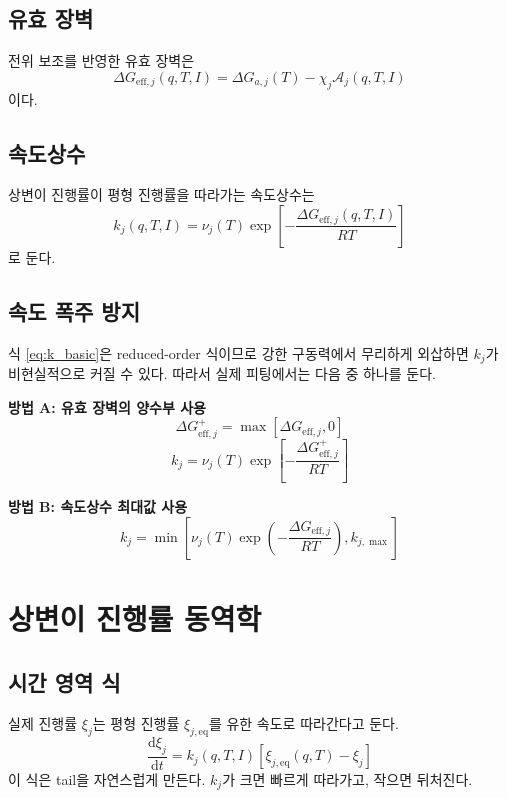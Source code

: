 \documentclass[11pt,a4paper]{article}
\newcommand{\dd}{\mathrm{d}}
\newcommand{\eff}{\mathrm{eff}}
\newcommand{\eq}{\mathrm{eq}}
\begin{document}
\subsection{유효 장벽}
전위 보조를 반영한 유효 장벽은
\begin{equation}
\Delta G_{\eff,j}(q,T,I)=\Delta G_{a,j}(T)-\chi_j\mathcal A_j(q,T,I)
\label{eq:Geff}
\end{equation}
이다.

\subsection{속도상수}
상변이 진행률이 평형 진행률을 따라가는 속도상수는
\begin{equation}
k_j(q,T,I)=\nu_j(T)\exp\left[-\frac{\Delta G_{\eff,j}(q,T,I)}{RT}\right]
\label{eq:k_basic}
\end{equation}
로 둔다.

\subsection{속도 폭주 방지}
식 \eqref{eq:k_basic}은 reduced-order 식이므로 강한 구동력에서 무리하게 외삽하면 \(k_j\)가 비현실적으로 커질 수 있다. 따라서 실제 피팅에서는 다음 중 하나를 둔다.

\textbf{방법 A: 유효 장벽의 양수부 사용}
\begin{equation}
\Delta G_{\eff,j}^{+}=\max\left[\Delta G_{\eff,j},0\right]
\end{equation}
\begin{equation}
k_j=\nu_j(T)\exp\left[-\frac{\Delta G_{\eff,j}^{+}}{RT}\right]
\end{equation}

\textbf{방법 B: 속도상수 최대값 사용}
\begin{equation}
k_j=\min\left[\nu_j(T)\exp\left(-\frac{\Delta G_{\eff,j}}{RT}\right),k_{j,\max}\right]
\end{equation}

\section{상변이 진행률 동역학}
\subsection{시간 영역 식}
실제 진행률 \(\xi_j\)는 평형 진행률 \(\xi_{j,\eq}\)를 유한 속도로 따라간다고 둔다.
\begin{equation}
\boxed{
\frac{\dd\xi_j}{\dd t}=k_j(q,T,I)\left[\xi_{j,\eq}(q,T)-\xi_j\right]
}
\label{eq:xi_ode_t}
\end{equation}
이 식은 tail을 자연스럽게 만든다. \(k_j\)가 크면 빠르게 따라가고, 작으면 뒤처진다.
\end{document}

